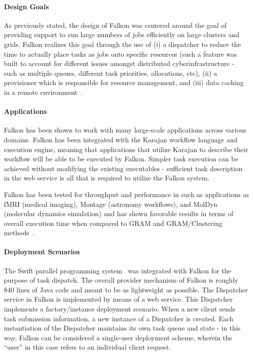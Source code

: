 \documentclass{sig-alternate}
\begin{document}
\paragraph{Design Goals}
As previously stated, the design of Falkon was centered
around the goal of providing support to run large numbers
of jobs efficiently on large clusters and grids. Falkon
realizes this goal through the use of (i) a
dispatcher to reduce the time to actually place
tasks as jobs onto specific resources (such a feature
was built to account for different issues amongst
distributed cyberinfrastructure - such as multiple
queues, different task priorities, allocations, etc),
(ii) a provisioner which is responsible for
resource management, and (iii) data caching in
a remote environment~\cite{1362680}.


\paragraph{Applications}

Falkon has been shown to work with many large-scale
applications across various domains. Falkon
has been integrated with the Karajan workflow language
and execution engine, meaning that applications
that utilize Karajan to describe their workflow
will be able to be executed by Falkon. Simpler
task execution can be achieved without
modifying the existing executables - sufficient
task description in the web service is all that
is required to utilize the Falkon system.

Falkon has been tested for throughput
and performance in such as applications
as fMRI (medical imaging), Montage (astronomy workflows),
and MolDyn (molecular dynamics simulation) and has shown
favorable results in terms of overall execution time when compared
to GRAM and GRAM/Clustering methods~\cite{1362680}.

\paragraph{Deployment Scenarios}

The Swift parallel programming system~\cite{Wilde2011} was integrated
with Falkon for the purpose of task dispatch. The overall provider
mechanism of Falkon is roughly 840 lines of Java code and meant
to be as lightweight as possible. The Dispatcher service
in Falkon is implemented by means of a web service.
This Dispatcher implements a factory/instance deployment scenario.
When a new client sends task submission information, a new instance
of a Dispatcher is created. Each instantiation of the Dispatcher maintains
its own task queue and state - in this way, Falkon can be considered
a single-user deployment scheme, wherein the ``user'' in this case
refers to an individual client request.
\end{document}
